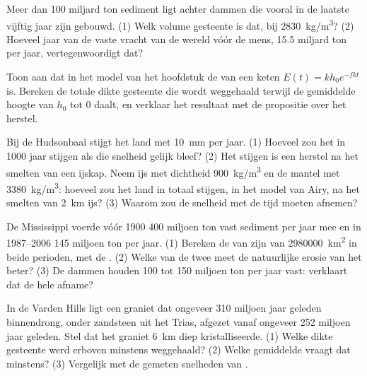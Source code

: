 \begin{exercise}[$\star\star$]\label{exo:g12:destruction-of-mountains:11}
Meer dan 100 miljard ton sediment ligt achter dammen die vooral in de
laatste vijftig jaar zijn gebouwd. (1) Welk volume gesteente is dat, bij
\qty{2830}{kg/m^3}? (2) Hoeveel jaar van de vaste vracht van de wereld vóór de mens,
15.5 miljard ton per jaar, vertegenwoordigt dat?
\end{exercise}

\begin{exercise}[$\star\star\star$]\label{exo:g12:destruction-of-mountains:12}
Toon aan dat in het model van het hoofdstuk de  van een keten
$E(t) = k h_0 e^{-fkt}$ is. Bereken de totale dikte gesteente die wordt weggehaald terwijl
de gemiddelde hoogte van $h_0$ tot 0 daalt, en verklaar het resultaat met de
propositie over het herstel.
\end{exercise}

\begin{exercise}[$\star\star\star$]\label{exo:g12:destruction-of-mountains:13}
Bij de Hudsonbaai stijgt het land met \qty{10}{mm} per jaar. (1) Hoeveel zou het
in 1000 jaar stijgen als die snelheid gelijk bleef? (2) Het stijgen is een
herstel na het smelten van een ijskap. Neem ijs met dichtheid
\qty{900}{kg/m^3} en de mantel met \qty{3380}{kg/m^3}: hoeveel zou het
land in totaal stijgen, in het model van Airy, na het smelten van \qty{2}{km} ijs?
(3) Waarom zou de snelheid met de tijd moeten afnemen?
\end{exercise}

\begin{exercise}[$\star\star\star$]\label{exo:g12:destruction-of-mountains:14}
De Mississippi voerde vóór 1900 400 miljoen ton vast sediment per jaar mee en
in 1987--2006 145 miljoen ton per jaar. (1) Bereken de
 van zijn  van \qty{2980000}{km^2} in beide perioden, met de
. (2) Welke van de twee meet de natuurlijke erosie van
het  beter? (3) De dammen houden 100 tot 150 miljoen ton per jaar vast: verklaart dat
de hele afname?
\end{exercise}

\begin{exercise}[$\star\star\star$]\label{exo:g12:destruction-of-mountains:15}
In de Varden Hills ligt een graniet dat ongeveer 310 miljoen jaar geleden binnendrong,
onder zandsteen uit het Trias, afgezet vanaf ongeveer 252 miljoen jaar geleden.
Stel dat het graniet \qty{6}{km} diep kristalliseerde. (1) Welke dikte gesteente
werd erboven minstens weggehaald? (2) Welke gemiddelde  vraagt dat
minstens? (3) Vergelijk met de gemeten snelheden van .
\end{exercise}

